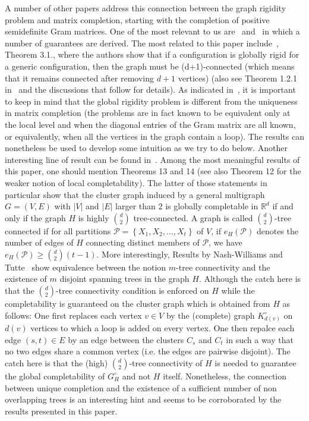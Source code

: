 \documentclass[12pt]{article}
\begin{document}
A number of other papers address this connection between the graph rigidity problem and matrix completion, starting with the completion of positive semidefinite Gram matrices. One of the most relevant to us are~\cite{hendrickson1992conditions} and~\cite{jackson2014combinatorial} in which a number of guarantees are derived.  The most related to this paper include~\cite{hendrickson1992conditions}, Theorem 3.1., where the authors show that if a configuration is globally rigid for a generic configuration, then the graph must be (d+1)-connected (which means that it remains connected after removing $d+1$ vertices) (also see Theorem 1.2.1 in~\cite{cucuringu2012graph} and the discussions that follow for details).  As indicated in~\cite{singer2010uniqueness}, it is important to keep in mind that the global rigidity problem is different from the uniqueness in matrix completion (the problems are in fact known to be equivalent only at the local level and  when the diagonal entries of the Gram matrix are all known, or equivalently, when all the vertices in the graph contain a loop).  The results can nonetheless be used to develop some intuition as we try to do below. Another interesting line of result can be found in~\cite{jackson2014combinatorial}.  Among the most meaningful results of this paper, one should mention Theorems 13 and 14 (see also Theorem 12 for the weaker notion of local completability). The latter of those statements in particular show that the cluster graph induced by a general multigraph $G = (V, E)$ with $|V|$ and $|E|$ larger than $2$ is globally completable in $\mathbb{R}^d$ if and only if the graph $H$ is highly ${d\choose 2}$ tree-connected.  A graph is called ${d\choose 2}$-tree connected if for all partitions $\mathcal{P} = \left\{X_1, X_2, \ldots , X_t\right\}$ of $V$,  if $e_{H}(\mathcal{P})$ denotes the number of edges of $H$ connecting distinct members of $\mathcal{P}$,  we have $e_H(\mathcal{P})\geq {d\choose 2}(t-1)$. More interestingly, Results by Nash-Williams and Tutte~\cite{nash1961edge, tutte1961problem} show equivalence between the notion $m$-tree connectivity and the existence of $m$ disjoint spanning trees in the graph $H$.  Although the catch here is that the ${d\choose 2}$-tree connectivity condition is enforced on $H$ while the completability is guaranteed on the cluster graph which is obtained from $H$ as follows: One first replaces each vertex $v\in V$ by the (complete) graph $K^\circ_{d(v)}$ on $d(v)$ vertices to which a loop is added on every vertex.  One then repalce each edge $(s,t)\in E$ by an edge between the clusters $C_s$ and $C_t$ in such a way that no two edges share a common vertex (i.e. the edges are pairwise disjoint).  The catch here is that the (high) ${d\choose 2}$-tree connectivity of $H$ is needed to guarantee the global completability of $G^\circ_H$ and not $H$ itself. Nonetheless, the connection between unique completion and the existence of a sufficient number of non overlapping trees is an interesting hint and seems to be corroborated by the results presented in this paper. 




\end{document}
